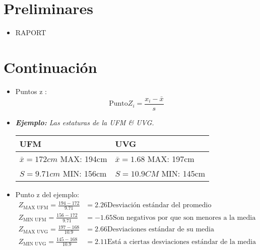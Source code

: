 \section*{Preliminares}
\begin{itemize}
    \item RAPORT
\end{itemize}


\section{Continuación }
\begin{itemize}
    \item Puntos z : 
        \[
          \text{Punto} Z_{i} = \frac{x_{i} - \bar{x}}{s} 
        \]
    
    \item \emph{\textbf{Ejemplo: }Las estaturas de la UFM \& UVG.}
        \begin{center}
           \begin{tabular}{ | p{5cm} | p{5cm} | }
               \hline
                    UFM & UVG    \\
               \hline
                    $\bar{x} = 172cm$ MAX: 194cm & $\bar{x} = 1.68$ MAX: 197cm\\
                    $S = 9.71cm$ MIN: 156cm & $S = 10.9CM$ MIN: 145cm \\ 
                \hline   
           \end{tabular}
        \end{center}
    
    \item Punto z del ejemplo:
        \begin{align*}
            Z_{\text{MAX UFM}} = \frac{194 - 172}{9.71}   &= 2.26 \text{Desviación estándar del promedio} \\ 
            Z_{\text{MIN UFM}} = \frac{156 - 172}{9.71} &= -1.65   \text{Son negativos por que son menores a la media}               \\  
            Z_{\text{MAX UVG}} = \frac{197 - 168}{10.9} &= 2.66  \text{Desviaciones estándar de su media} \\  
            Z_{\text{MIN UVG}} = \frac{145 - 168}{10.9} &= 2.11 \text{Está a ciertas desviaciones estándar de la media}                   \\  


\end{align*}
\end{itemize}
